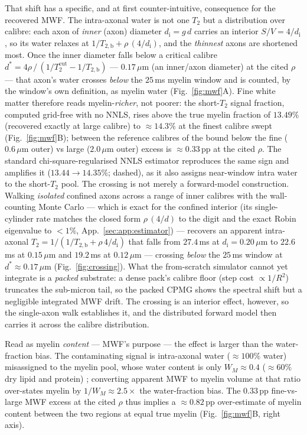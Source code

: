 That shift has a specific, and at first counter-intuitive, consequence for the recovered
MWF. The intra-axonal water is not one $T_2$ but a distribution over calibre: each axon of
\emph{inner} (axon) diameter $d_{\mathrm i}=g\,d$ carries an interior $S/V=4/d_{\mathrm i}$, so its
water relaxes at $1/T_{2,\mathrm b}+\rho\,(4/d_{\mathrm i})$, and the \emph{thinnest} axons are
shortened most. Once the inner diameter falls below a critical calibre
$d^{\ast}=4\rho\,/\,(1/T_2^{\mathrm{cut}}-1/T_{2,\mathrm b})$ --- $0.17\,\mu$m (an inner/axon
diameter) at the cited $\rho$ --- that axon's water crosses \emph{below} the $25$\,ms myelin
window and is counted, by the window's own definition, as myelin water (Fig.~\ref{fig:mwf}A). Fine
white matter therefore reads myelin-\emph{richer}, not poorer: the short-$T_2$ signal
fraction, computed grid-free with no NNLS, rises above the true myelin fraction of $13.49\%$
(recovered exactly at large calibre) to ${\approx}14.3\%$ at the finest calibre swept
(Fig.~\ref{fig:mwf}B); between the reference calibres of the bound below the fine ($0.6\,\mu$m
outer) vs large ($2.0\,\mu$m outer) excess is ${\approx}0.33$\,pp at the cited $\rho$.
The standard chi-square-regularised NNLS estimator reproduces the same sign and amplifies
it ($13.44\!\to\!14.35\%$; dashed), as it also assigns near-window intra water to the
short-$T_2$ pool. The crossing is not merely a forward-model construction. Walking \emph{isolated} confined
axons across a range of inner calibres with the wall-counting Monte Carlo --- which is exact
for the confined interior (its single-cylinder rate matches the closed form $\rho\,(4/d)$ to
the digit and the exact Robin eigenvalue to $<1\%$, App.~\ref{sec:app:estimator}) --- recovers
an apparent intra-axonal $T_2=1/(1/T_{2,\mathrm b}+\rho\,4/d_{\mathrm i})$ that falls from
$27.4$\,ms at $d_{\mathrm i}=0.20\,\mu$m to $22.6$\,ms at $0.15\,\mu$m and $19.2$\,ms at
$0.12\,\mu$m --- crossing \emph{below} the $25$\,ms window at $d^{\ast}\approx0.17\,\mu$m
(Fig.~\ref{fig:crossing}). What the from-scratch simulator cannot yet integrate is a
\emph{packed} substrate: a dense pack's calibre floor (step cost $\propto 1/R^2$) truncates the
sub-micron tail, so the packed CPMG shows the spectral shift but a negligible integrated MWF
drift. The crossing is an interior effect, however, so the single-axon walk establishes it, and
the distributed forward model then carries it across the calibre distribution.

Read as myelin \emph{content} --- MWF's purpose --- the effect is larger than the
water-fraction bias. The contaminating signal is intra-axonal water (${\approx}100\%$
water) misassigned to the myelin pool, whose water content is only $W_M{\approx}0.4$
(${\approx}60\%$ dry lipid and protein) \citep{West2018}; converting apparent MWF to
myelin volume at that ratio over-states myelin by $1/W_M{\approx}2.5\times$ the
water-fraction bias. The $0.33$\,pp fine-vs-large MWF excess at the cited $\rho$ thus
implies a ${\approx}0.82$\,pp over-estimate of myelin content between the two regions at
equal true myelin (Fig.~\ref{fig:mwf}B, right axis).

